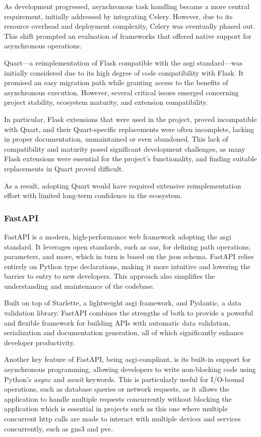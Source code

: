 As development progressed, asynchronous task handling became a more central requirement, initially addressed by integrating 
Celery. However, due to its resource overhead and deployment complexity, Celery was eventually phased out. This shift 
prompted an evaluation of frameworks that offered native support for asynchronous operations.

Quart—a reimplementation of Flask compatible with the \ac{asgi} standard—was initially considered due to its high degree of 
code compatibility with Flask. It promised an easy migration path while granting access to the benefits of asynchronous 
execution. However, several critical issues emerged concerning project stability, ecosystem maturity, and extension 
compatibility.

In particular, Flask extensions that were used in the project, proved incompatible with Quart, and their Quart-specific 
replacements  were often incomplete, lacking in proper documentation,  unmaintained or even abandoned.
This lack of compatibility and maturity posed significant development challenges, as many Flask extensions were essential
for the project's functionality, and finding suitable replacements in Quart proved difficult.

As a result, adopting Quart would have required extensive reimplementation effort with limited long-term confidence in the 
ecosystem.

\subsubsection{FastAPI}

FastAPI is a modern, high-performance web framework adopting the \ac{asgi} standard. It leverages open standards, such as 
\ac{oas}, for defining path operations, parameters, and more, which in turn is based on the \ac{json} schema.
FastAPI relies entirely on Python type declarations, making it more intuitive and lowering the barrier to entry to new 
developers. This approach also simplifies the understanding and maintenance of the codebase.

Built on top of Starlette, a lightweight \ac{asgi} framework, and Pydantic, a data validation library. FastAPI combines the 
strengths of both to provide a powerful and flexible framework for building APIs with automatic data validation, 
serialization and documentation generation, all of which significantly enhance developer productivity.

Another key feature of FastAPI, being \ac{asgi}-compliant, is its built-in support for asynchronous programming, allowing 
developers to write non-blocking code using Python's \textit{async} and \textit{await} keywords. This is particularly useful 
for I/O-bound operations, such as database queries or network requests, as it allows the application to handle multiple 
requests concurrently without blocking the application which is essential in projects such as this one where multiple 
concurrent \ac{http} calls are made to interact with multiple devices and services concurrently, such as \ac{gns3} and 
\ac{pve}.

